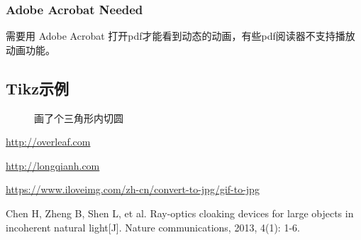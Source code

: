 \documentclass{article}
\begin{document}
\subsubsection{Adobe Acrobat Needed}
需要用 Adobe Acrobat 打开pdf才能看到动态的动画，有些pdf阅读器不支持播放动画功能。
\begin{figure}[H]
\centering
{}

\end{figure}


\subsection{Tikz示例}
\begin{figure}[H]
\centering
{}
\caption{画了个三角形内切圆}
\end{figure}



\begin{thebibliography}{9} %
  \url{http://overleaf.com}

  \url{http://longqianh.com}

  \url{https://www.iloveimg.com/zh-cn/convert-to-jpg/gif-to-jpg }

Chen H, Zheng B, Shen L, et al. Ray-optics cloaking devices for large objects in incoherent natural light[J]. Nature communications, 2013, 4(1): 1-6.

\end{thebibliography}
\end{document}

